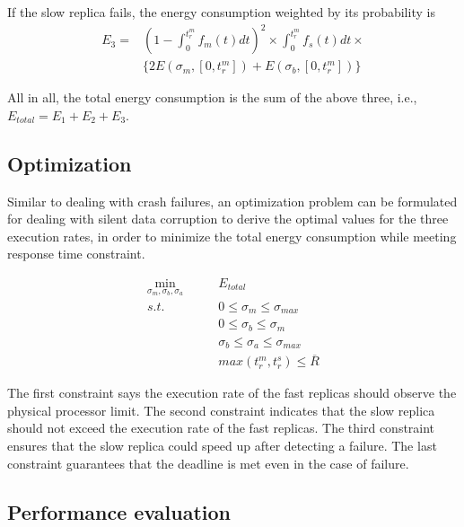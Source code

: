 If the slow replica fails, the energy consumption weighted by its probability is 
\begin{equation}
\begin{split}
E_3 = & (1 - \int_{0}^{t_r^m} f_m(t)dt)^2 \times \int_{0}^{t_r^m} f_s(t)dt \times \\  & \{2E(\sigma_m, [0, t_r^m])+E(\sigma_b, [0, t_r^m])\}
\end{split}
\end{equation}

All in all, the total energy consumption is the sum of the above three, i.e., $E_{total}=E_1 + E_2 + E_3$. 

\subsection{Optimization}
Similar to dealing with crash failures, an optimization problem can be formulated for dealing with silent data corruption to derive the optimal values for the three execution rates, in order to minimize the total energy consumption while meeting response time constraint. 

\begin{equation}
\begin{alignedat}{2}
\min_{\sigma_m,\sigma_b,\sigma_a} \qquad  & E_{total} \\
s.t.  \qquad          & 0 \leq \sigma_m \leq \sigma_{max} \\
                      & 0 \leq \sigma_b \leq \sigma_m \\
                      & \sigma_b \leq \sigma_a \leq \sigma_{max} \\
                      & max(t_r^m, t_r^s) \leq \overline{R}
\end{alignedat}
\end{equation}

The first constraint says the execution rate of the fast replicas should observe the physical processor limit. The second constraint indicates that the slow replica should not exceed the execution rate of the fast replicas. The third constraint ensures that the slow replica could speed up after detecting a failure. The last constraint guarantees that the deadline is met even in the case of failure.



\subsection{Performance evaluation}

